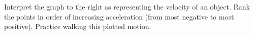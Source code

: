 \label{fnt8.2.1-4}

Interpret the graph to the right as representing the velocity of an object. Rank the points in order of increasing acceleration (from most negative to most positive). Practice walking this plotted motion.